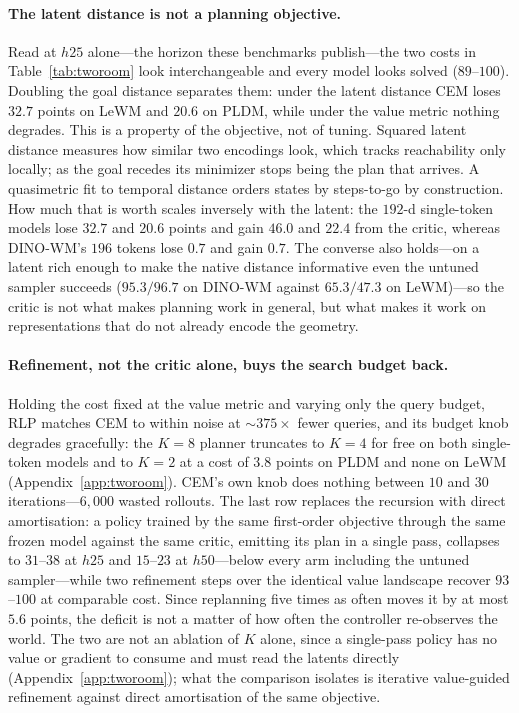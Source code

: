 \paragraph{The latent distance is not a planning objective.}
Read at $h25$ alone---the horizon these benchmarks publish---the two costs in
Table~\ref{tab:tworoom} look interchangeable and every model looks solved
($89$--$100$). Doubling the goal distance separates them: under the latent
distance CEM loses $32.7$ points on LeWM and $20.6$ on PLDM, while under the
value metric nothing degrades. This is a property of the objective, not of
tuning. Squared latent distance measures how similar two encodings look, which
tracks reachability only locally; as the goal recedes its minimizer stops being
the plan that arrives. A quasimetric fit to temporal distance orders states by
steps-to-go by construction. How much that is worth scales inversely with the
latent: the $192$-d single-token models lose $32.7$ and $20.6$ points and gain
$46.0$ and $22.4$ from the critic, whereas DINO-WM's $196$ tokens lose $0.7$ and
gain $0.7$. The converse also holds---on a latent rich enough to make the native
distance informative even the untuned sampler succeeds ($95.3/96.7$ on DINO-WM
against $65.3/47.3$ on LeWM)---so the critic is not what makes planning work in
general, but what makes it work on representations that do not already encode
the geometry.

\paragraph{Refinement, not the critic alone, buys the search budget back.}
Holding the cost fixed at the value metric and varying only the query budget,
RLP matches CEM to within noise at ${\sim}375\times$ fewer queries, and its
budget knob degrades gracefully: the $K{=}8$ planner truncates to $K{=}4$ for
free on both single-token models and to $K{=}2$ at a cost of $3.8$ points on
PLDM and none on LeWM (Appendix~\ref{app:tworoom}). CEM's own knob does nothing
between $10$ and $30$ iterations---$6{,}000$ wasted rollouts. The last row
replaces the recursion with direct amortisation: a policy trained by the same
first-order objective through the same frozen model against the same critic,
emitting its plan in a single pass, collapses to $31$--$38$ at $h25$ and
$15$--$23$ at $h50$---below every arm including the untuned sampler---while two
refinement steps over the identical value landscape recover $93$--$100$ at
comparable cost. Since replanning five times as often moves it by at most $5.6$
points, the deficit is not a matter of how often the controller re-observes the
world. The two are not an ablation of $K$ alone, since a single-pass policy has
no value or gradient to consume and must read the latents directly
(Appendix~\ref{app:tworoom}); what the comparison isolates is iterative
value-guided refinement against direct amortisation of the same objective.

